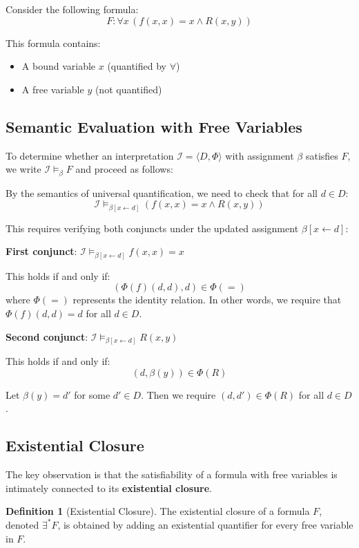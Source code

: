 \documentclass[11pt,a4paper]{article}
\theoremstyle{definition}
\newtheorem{definition}{Definition}[section]
\theoremstyle{plain}
\theoremstyle{remark}
\begin{document}
Consider the following formula:
\[
F: \forall x \, (f(x, x) = x \wedge R(x, y))
\]

This formula contains:
\begin{itemize}
    \item A bound variable $x$ (quantified by $\forall$)
    \item A free variable $y$ (not quantified)
\end{itemize}

\subsection{Semantic Evaluation with Free Variables}

To determine whether an interpretation $\mathcal{I} = \langle D, \Phi \rangle$ with assignment $\beta$ satisfies $F$, we write $\mathcal{I} \models_\beta F$ and proceed as follows:

By the semantics of universal quantification, we need to check that for all $d \in D$:
\[
\mathcal{I} \models_{\beta[x \leftarrow d]} (f(x, x) = x \wedge R(x, y))
\]

This requires verifying both conjuncts under the updated assignment $\beta[x \leftarrow d]$:

\textbf{First conjunct}: $\mathcal{I} \models_{\beta[x \leftarrow d]} f(x, x) = x$

This holds if and only if:
\[
(\Phi(f)(d, d), d) \in \Phi(=)
\]
where $\Phi(=)$ represents the identity relation. In other words, we require that $\Phi(f)(d, d) = d$ for all $d \in D$.

\textbf{Second conjunct}: $\mathcal{I} \models_{\beta[x \leftarrow d]} R(x, y)$

This holds if and only if:
\[
(d, \beta(y)) \in \Phi(R)
\]

Let $\beta(y) = d'$ for some $d' \in D$. Then we require $(d, d') \in \Phi(R)$ for all $d \in D$.

\subsection{Existential Closure}

The key observation is that the satisfiability of a formula with free variables is intimately connected to its \textbf{existential closure}.

\begin{tcolorbox}[colback=green!5!white,colframe=green!75!black,title=\textbf{Existential Closure}]
\begin{definition}[Existential Closure]
The existential closure of a formula $F$, denoted $\exists^* F$, is obtained by adding an existential quantifier for every free variable in $F$.
\end{definition}
\end{tcolorbox}
\end{document}

